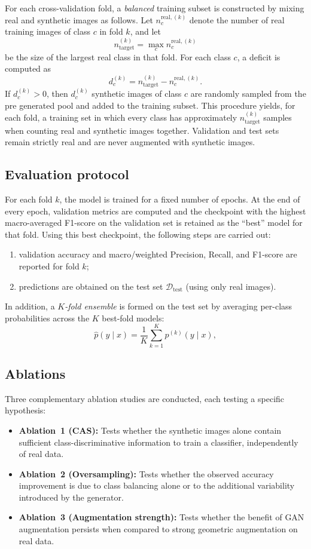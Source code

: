 For each cross-validation fold, a \emph{balanced} training subset is constructed by mixing real and synthetic images as follows. Let $n_c^{\text{real},(k)}$ denote the number of real training images of class $c$ in fold $k$, and let
\[
n_{\text{target}}^{(k)} = \max_c n_c^{\text{real},(k)}
\]
be the size of the largest real class in that fold. For each class $c$, a deficit is computed as
\[
d_c^{(k)} = n_{\text{target}}^{(k)} - n_c^{\text{real},(k)}.
\]
If $d_c^{(k)} > 0$, then $d_c^{(k)}$ synthetic images of class $c$ are randomly sampled from the pre generated pool and added to the training subset. This procedure yields, for each fold, a training set in which every class has approximately $n_{\text{target}}^{(k)}$ samples when counting real and synthetic images together. Validation and test sets remain strictly real and are never augmented with synthetic images.




\subsection{Evaluation protocol}
For each fold $k$, the model is trained for a fixed number of epochs. At the end of every epoch, validation metrics are computed and the checkpoint with the highest macro-averaged F1-score on the validation set is retained as the ``best'' model for that fold. Using this best checkpoint, the following steps are carried out:
\begin{enumerate}
    \item validation accuracy and macro/weighted Precision, Recall, and F1-score are reported for fold $k$;
    \item predictions are obtained on the test set $\mathcal{D}_{\text{test}}$ (using only real images).
\end{enumerate}

In addition, a \emph{$K$-fold ensemble} is formed on the test set by averaging per-class probabilities across the $K$ best-fold models:
\[
\hat{p}(y \mid x) = \frac{1}{K} \sum_{k=1}^K p^{(k)}(y \mid x),
\]






\subsection{Ablations}

Three complementary ablation studies are conducted, each testing a specific hypothesis:
\begin{itemize}
    \item \textbf{Ablation~1 (CAS):} Tests whether the synthetic images alone contain sufficient class-discriminative information to train a classifier, independently of real data.
    \item \textbf{Ablation~2 (Oversampling):} Tests whether the observed accuracy improvement is due to class balancing alone or to the additional variability introduced by the generator.
    \item \textbf{Ablation~3 (Augmentation strength):} Tests whether the benefit of GAN augmentation persists when compared to strong geometric augmentation on real data.
\end{itemize}

